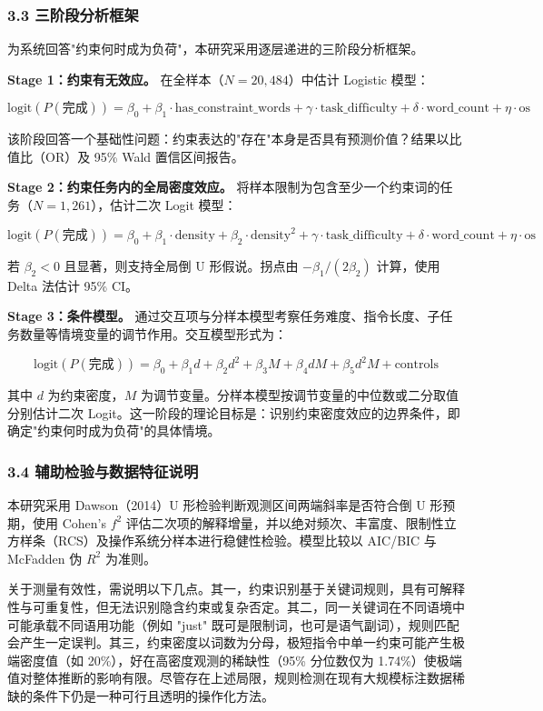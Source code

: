 \documentclass[12pt,a4paper,openany,oneside]{ctexrep}
\begin{document}
\subsubsection{3.3 三阶段分析框架}


为系统回答"约束何时成为负荷"，本研究采用逐层递进的三阶段分析框架。

\textbf{Stage 1：约束有无效应。} 在全样本（$N=20{,}484$）中估计 Logistic 模型：

\[
\text{logit}(P(\text{完成})) = \beta_0 + \beta_1 \cdot \text{has\_constraint\_words} + \gamma \cdot \text{task\_difficulty} + \delta \cdot \text{word\_count} + \eta \cdot \text{os}
\]


该阶段回答一个基础性问题：约束表达的"存在"本身是否具有预测价值？结果以比值比（OR）及 95\% Wald 置信区间报告。

\textbf{Stage 2：约束任务内的全局密度效应。} 将样本限制为包含至少一个约束词的任务（$N=1{,}261$），估计二次 Logit 模型：

\[
\text{logit}(P(\text{完成})) = \beta_0 + \beta_1 \cdot \text{density} + \beta_2 \cdot \text{density}^2 + \gamma \cdot \text{task\_difficulty} + \delta \cdot \text{word\_count} + \eta \cdot \text{os}
\]


若 $\beta_2<0$ 且显著，则支持全局倒 U 形假说。拐点由 $-\beta_1/(2\beta_2)$ 计算，使用 Delta 法估计 95\% CI。

\textbf{Stage 3：条件模型。} 通过交互项与分样本模型考察任务难度、指令长度、子任务数量等情境变量的调节作用。交互模型形式为：

\[
\text{logit}(P(\text{完成})) = \beta_0 + \beta_1 d + \beta_2 d^2 + \beta_3 M + \beta_4 dM + \beta_5 d^2 M + \text{controls}
\]


其中 $d$ 为约束密度，$M$ 为调节变量。分样本模型按调节变量的中位数或二分取值分别估计二次 Logit。这一阶段的理论目标是：识别约束密度效应的边界条件，即确定"约束何时成为负荷"的具体情境。

\subsubsection{3.4 辅助检验与数据特征说明}


本研究采用 Dawson（2014）U 形检验判断观测区间两端斜率是否符合倒 U 形预期，使用 Cohen's $f^2$ 评估二次项的解释增量，并以绝对频次、丰富度、限制性立方样条（RCS）及操作系统分样本进行稳健性检验。模型比较以 AIC/BIC 与 McFadden 伪 $R^2$ 为准则。

关于测量有效性，需说明以下几点。其一，约束识别基于关键词规则，具有可解释性与可重复性，但无法识别隐含约束或复杂否定。其二，同一关键词在不同语境中可能承载不同语用功能（例如 "just" 既可是限制词，也可是语气副词），规则匹配会产生一定误判。其三，约束密度以词数为分母，极短指令中单一约束可能产生极端密度值（如 20\%），好在高密度观测的稀缺性（95\% 分位数仅为 1.74\%）使极端值对整体推断的影响有限。尽管存在上述局限，规则检测在现有大规模标注数据稀缺的条件下仍是一种可行且透明的操作化方法。
\end{document}
